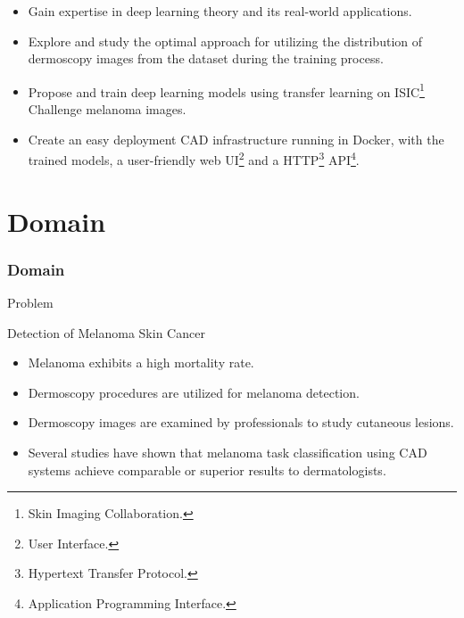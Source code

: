 \documentclass[dvipsnames,mathserif]{beamer}
\begin{document}
{\begin{frame}
      \footnotesize
      \begin{itemize}
        \item Gain expertise in deep learning theory and its real-world
          applications.
        \item Explore and study the optimal approach for utilizing the distribution
          of dermoscopy images from the dataset during the training process.
        \item Propose and train deep learning models using transfer learning on ISIC\footnote{Skin Imaging Collaboration.}
          Challenge melanoma images.
        \item Create an easy deployment CAD infrastructure running in Docker,
          with the trained models, a user-friendly web UI\footnote{User
          Interface.} and a HTTP\footnote{Hypertext Transfer Protocol.} API\footnote{Application Programming Interface.}.
      \end{itemize}


    \end{frame}

    \section{Domain}

    \begin{frame}
      \frametitle{Domain}
    \end{frame}

    \begin{frame}
      \begin{center}
        \Huge Problem
      \end{center}
    \end{frame}


    \begin{frame}
      \large Detection of Melanoma Skin Cancer
      \vspace{0.25cm}

      \footnotesize
      \begin{itemize}
        \item Melanoma exhibits a high mortality rate.
        \item Dermoscopy procedures are utilized for melanoma detection.
        \item Dermoscopy images are examined by professionals to study cutaneous lesions.
        \item Several studies have shown that melanoma task classification
          using CAD systems achieve comparable or superior results to
          dermatologists.
      \end{itemize}



\end{frame}}
\end{document}
